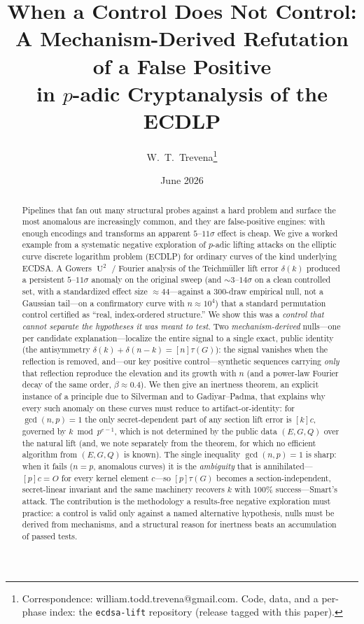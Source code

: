 \documentclass[11pt]{article}
\title{\bf When a Control Does Not Control:\\
A Mechanism-Derived Refutation of a False Positive\\
in $p$-adic Cryptanalysis of the ECDLP}
\author{W.\ T.\ Trevena\thanks{Correspondence: william.todd.trevena@gmail.com.
Code, data, and a per-phase index: the \texttt{ecdsa-lift} repository
(release tagged with this paper).}}
\date{June 2026}
\theoremstyle{definition}
\DeclareMathOperator{\Uk}{U}
\begin{document}
\maketitle

\begin{abstract}
Pipelines that fan out many structural probes against a hard problem and
surface the most anomalous are increasingly common, and they are
false-positive engines: with enough encodings and transforms an apparent
$5$--$11\sigma$ effect is cheap. We give a worked example from a
systematic negative exploration of $p$-adic lifting attacks on the
elliptic curve discrete logarithm problem (ECDLP) for ordinary curves of
the kind underlying ECDSA. A Gowers $\Uk^2$ / Fourier analysis of the
Teichm\"uller lift error $\delta(k)$ produced a persistent
$5$--$11\sigma$ anomaly on the original sweep (and $\sim$$3$--$14\sigma$ on a clean
controlled set, with a standardized effect size $\approx44$---against a
$300$-draw empirical null, not a Gaussian tail---on a confirmatory curve
with $n\approx 10^4$) that a standard permutation control certified
as ``real, index-ordered structure.'' We show this was a \emph{control that
cannot separate the hypotheses it was meant to test}. Two
\emph{mechanism-derived} nulls---one per candidate explanation---localize
the entire signal to a single exact, public identity (the antisymmetry
$\delta(k)+\delta(n-k)=[n]\tau(G)$): the signal vanishes when the
reflection is removed, and---our key positive control---synthetic
sequences carrying \emph{only} that reflection reproduce the elevation
and its growth with $n$ (and a power-law Fourier decay of the same order,
$\beta\approx0.4$). We then give an inertness theorem, an explicit
instance of a principle due to Silverman and to Gadiyar--Padma, that
explains why every such anomaly on these curves must reduce to
artifact-or-identity: for $\gcd(n,p)=1$ the only secret-dependent part of
any section lift error is $[k]c$, governed by $k \bmod p^{e-1}$, which is
not determined by the public data $(E,G,Q)$ over the natural lift (and,
we note separately from the theorem, for which no efficient algorithm
from $(E,G,Q)$ is known). The
single inequality $\gcd(n,p)=1$ is sharp: when it fails ($n=p$, anomalous
curves) it is the \emph{ambiguity} that is annihilated---$[p]c=O$ for
every kernel element $c$---so $[p]\tau(G)$ becomes a section-independent,
secret-linear invariant and the same machinery recovers $k$ with $100\%$
success---Smart's attack. The contribution is the methodology a
results-free negative exploration must practice: a control is valid only
against a named alternative hypothesis, nulls must be derived from
mechanisms, and a structural reason for inertness beats an accumulation
of passed tests.
\end{abstract}
\end{document}
